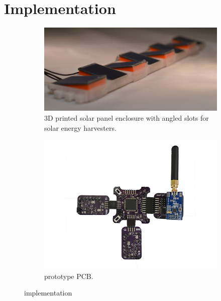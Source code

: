 \section{Implementation}
\label{sec:implementation}

\begin{figure}
    \centering
    \begin{subfigure}[t]{\columnwidth}
        \includegraphics[width=\columnwidth]{figs/panels_lossy.jpg}
        \caption{3D printed solar panel enclosure with angled slots for solar energy harvesters.}
        \label{fig:mounting}
    \end{subfigure}

    \begin{subfigure}[t]{\columnwidth}
        \includegraphics[width=\columnwidth]{figs/board.png}
        \caption{ \sysname prototype PCB.}
        \label{fig:pcb}
    \end{subfigure}
    \caption{\sysname implementation \label{fig:prototype}}
\end{figure}

